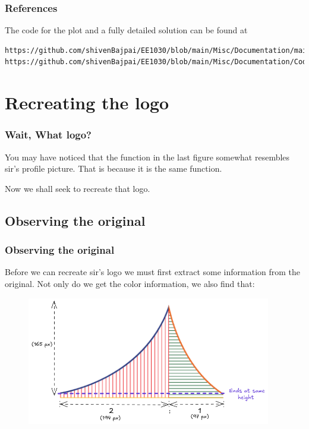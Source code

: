 \documentclass{beamer}
\theoremstyle{remark}
\numberwithin{equation}{section}
\begin{document}
\begin{frame}[fragile]
    \frametitle{References}

    The code for the plot and a fully detailed solution can be found at
	{\scriptsize
	\begin{lstlisting}
https://github.com/shivenBajpai/EE1030/blob/main/Misc/Documentation/main.pdf
https://github.com/shivenBajpai/EE1030/blob/main/Misc/Documentation/Codes/solution.py
	\end{lstlisting}
	}
    
\end{frame}

\section{Recreating the logo}
\begin{frame}
    \frametitle{Wait, What logo?}

    You may have noticed that the function in the last figure somewhat resembles sir's profile picture. That is because it is the same function.
    \bigskip
    
    Now we shall seek to recreate that logo.
\end{frame}

\subsection{Observing the original}
\begin{frame}[fragile]
    \frametitle{Observing the original}

    Before we can recreate sir's logo we must first extract some information from the original. Not only do we get the color information, we also find that:

    \begin{figure}[H]
		\centering
		\includegraphics[width=0.95\textwidth]{Figures/anotated_original.png}
	\end{figure}

\end{frame}
\end{document}

